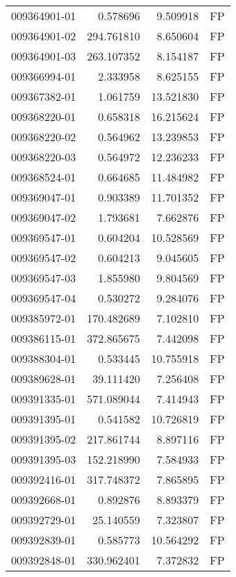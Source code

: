 \begin{tabular}{lrrl}
009364901-01 &    0.578696 &       9.509918 &   FP \\
009364901-02 &  294.761810 &       8.650604 &   FP \\
009364901-03 &  263.107352 &       8.154187 &   FP \\
009366994-01 &    2.333958 &       8.625155 &   FP \\
009367382-01 &    1.061759 &      13.521830 &   FP \\
009368220-01 &    0.658318 &      16.215624 &   FP \\
009368220-02 &    0.564962 &      13.239853 &   FP \\
009368220-03 &    0.564972 &      12.236233 &   FP \\
009368524-01 &    0.664685 &      11.484982 &   FP \\
009369047-01 &    0.903389 &      11.701352 &   FP \\
009369047-02 &    1.793681 &       7.662876 &   FP \\
009369547-01 &    0.604204 &      10.528569 &   FP \\
009369547-02 &    0.604213 &       9.045605 &   FP \\
009369547-03 &    1.855980 &       9.804569 &   FP \\
009369547-04 &    0.530272 &       9.284076 &   FP \\
009385972-01 &  170.482689 &       7.102810 &   FP \\
009386115-01 &  372.865675 &       7.442098 &   FP \\
009388304-01 &    0.533445 &      10.755918 &   FP \\
009389628-01 &   39.111420 &       7.256408 &   FP \\
009391335-01 &  571.089044 &       7.414943 &   FP \\
009391395-01 &    0.541582 &      10.726819 &   FP \\
009391395-02 &  217.861744 &       8.897116 &   FP \\
009391395-03 &  152.218990 &       7.584933 &   FP \\
009392416-01 &  317.748372 &       7.865895 &   FP \\
009392668-01 &    0.892876 &       8.893379 &   FP \\
009392729-01 &   25.140559 &       7.323807 &   FP \\
009392839-01 &    0.585773 &      10.564292 &   FP \\
009392848-01 &  330.962401 &       7.372832 &   FP \\

\end{tabular}
